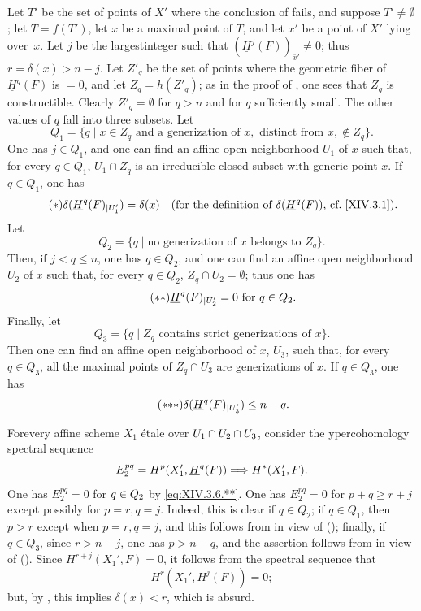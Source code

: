 Let $T'$ be the set of points of $X'$ where the conclusion of  fails, and suppose $T' \neq \emptyset$; let $T=f(T')$, let $x$ be a maximal point of $T$, and let $x'$ be a point of $X'$ lying over~$x$. Let $j$ be the largest\pageoriginale integer such that $(\underline{H}^j(F))_{\bar{x}'} \neq 0$; thus $r=\delta(x)>n-j$. Let $Z'_q$ be the set of points where the geometric fiber of $\underline{H}^q(F)$ is $=0$, and let $Z_q =h(Z'_q)$; as in the proof of , one sees that $Z_q$ is constructible. Clearly $Z'_q=\emptyset$ for $q>n$ and for $q$ sufficiently small. The other values of $q$ fall into three subsets. Let
$$
Q_1=\{q\mid x\in Z_q\text{ and a generization of }x, \text{ distinct from }x, \not\in Z_q\}.
$$
One has $j \in Q_1$, and one can find an affine open neighborhood $U_1$ of $x$ such that, for every $q \in Q_1$, $U_1 \cap Z_q$ is an irreducible closed subset with generic point $x$. If $q \in Q_1$, one has
\begin{equation*} \label{eq:XIV.3.6.*} \tag{$*$} \delta(\sisi{\underline{H}^q(F){|U_1'}}{\underline{H}^q(F)_{|U_1'}})=\delta(x)\quad\text{(for the definition of $\delta(\underline{H}^q(F))$, \cf \Ref{XIV.3.1})}.
\end{equation*}
Let
$$
Q_2=\{q\mid\text{no generization of $x$ belongs to }Z_q\}.
$$
Then, if $j<q\leq n$, one has $q\in Q_2$, and one can find an affine open neighborhood $U_2$ of $x$ such that, for every $q \in Q_2$, $Z_q \cap U_2 = \emptyset$; thus one has
\begin{equation*} \label{eq:XIV.3.6.**} \tag{$**$} \sisi{\underline{H}^q(F){|U'_2}}{\underline{H}^q(F)_{|U'_2}}=0\text{ for }q\in Q_2.
\end{equation*}
Finally, let
$$
Q_3= \{q\mid Z_q \text{ contains strict generizations of }x\}.
$$
Then one can find an affine open neighborhood of $x$, $U_3$, such that, for every $q \in Q_3$, all the maximal points of $Z_q \cap U_3$ are generizations of $x$. If $q \in Q_3$, one has
\begin{equation*} \label{eq:XIV.3.6.***} \tag{${*}{*}{*}$} \delta(\sisi{\underline{H}^q(F){|U'_3}}{\underline{H}^q(F)_{|U'_3}})\leq n-q.
\end{equation*}

For\pageoriginale every affine scheme $X_1$ \'{e}tale over $U_1 \cap U_2 \cap \sisi{{}}{U}_3$, consider the ypercohomology spectral sequence
$$
E^{pq}_2= H^p(X_1', \underline{H}^q(F)) \To H^*(X'_1, F).
$$
One has $E^{pq}_2=0$ for $q\sisi{>}{\in Q_2}$ by \eqref{eq:XIV.3.6.**}. One has $E^{pq}_2=0$ for $p+q \geq r+j$ except possibly for $p=r, q=j$. Indeed, this is clear if $q\in Q_2$; if $q\in Q_1$, then $p>r$ except when $p=r, q=j$, and this follows from  in view of (); finally, if $q\in Q_3$, since $r>n-j$, one has $p>n-q$, and the assertion follows from  in view of (). Since $H^{r+j}(X_1', F)=0$, it follows from the spectral sequence that
$$H^r(X_1', \underline{H}^j(F))=0;$$
but, by , this implies $\delta(x)<r$, which is absurd.

